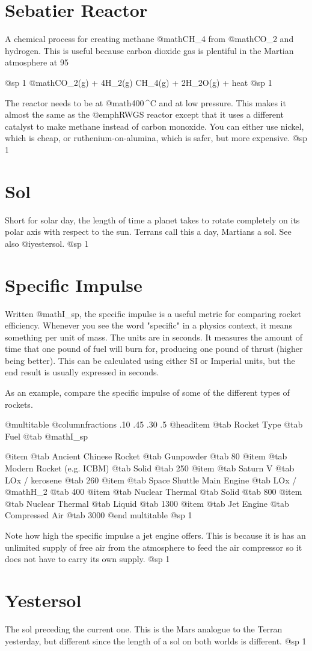 \section{Sebatier Reactor}
A chemical process for creating methane @math{CH_4} from @math{CO_2} and hydrogen. This is useful because carbon dioxide gas is plentiful in the Martian atmosphere at 95 %

@sp 1
@math{CO_2(g) + 4H_2(g) \rightarrow CH_4(g) + 2H_2O(g) + heat}
@sp 1

The reactor needs to be at @math{400\,^{\circ}{\rm C}} and at low pressure. This makes it almost the same as the @emph{RWGS reactor} except that it uses a different catalyst to make methane instead of carbon monoxide. You can either use nickel, which is cheap, or ruthenium-on-alumina, which is safer, but more expensive.
@sp 1

\section{Sol}
Short for solar day, the length of time a planet takes to rotate completely on its polar axis with respect to the sun. Terrans call this a day, Martians a sol. See also @i{yestersol}.
@sp 1

\section{Specific Impulse}
Written @math{I_{sp}}, the specific impulse is a useful metric for comparing rocket efficiency. Whenever you see the word "specific" in a physics context, it means something per unit of mass. The units are in seconds. It measures the amount of time that one pound of fuel will burn for, producing one pound of thrust (higher being better). This can be calculated using either SI or Imperial units, but the end result is usually expressed in seconds. 

As an example, compare the specific impulse of some of the different types of rockets.

@multitable @columnfractions .10 .45 .30 .5
@headitem @tab Rocket Type @tab Fuel @tab @math{I_{sp}}

@item 
@tab Ancient Chinese Rocket
@tab Gunpowder
@tab 80
@item 
@tab Modern Rocket (e.g. ICBM)
@tab Solid
@tab 250
@item 
@tab Saturn V
@tab LOx / kerosene
@tab 260
@item 
@tab Space Shuttle Main Engine
@tab LOx / @math{H_2}
@tab 400
@item 
@tab Nuclear Thermal
@tab Solid
@tab 800
@item 
@tab Nuclear Thermal 
@tab Liquid
@tab 1300
@item 
@tab Jet Engine 
@tab Compressed Air
@tab 3000
@end multitable
@sp 1

Note how high the specific impulse a jet engine offers. This is because it is has an unlimited supply of free air from the atmosphere to feed the air compressor so it does not have to carry its own supply.
@sp 1

\section{Yestersol}
The sol preceding the current one. This is the Mars analogue to the Terran yesterday, but different since the length of a sol on both worlds is different.
@sp 1

